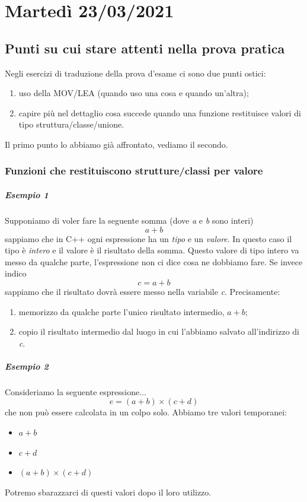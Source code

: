 \documentclass[11pt]{report}
\theoremstyle{definition}
\begin{document}
\chapter{Martedì 23/03/2021}
\section{Punti su cui stare attenti nella prova pratica} Negli esercizi di traduzione della prova d'esame ci sono due punti ostici:
\begin{enumerate}
\item uso della MOV/LEA (quando uso una cosa e quando un'altra);
\item capire più nel dettaglio cosa succede quando una funzione restituisce valori di tipo struttura/classe/unione.
\end{enumerate}
Il primo punto lo abbiamo già affrontato, vediamo il secondo. 
\subsection{Funzioni che restituiscono strutture/classi per valore}
\paragraph{Esempio 1} Supponiamo di voler fare la seguente somma (dove \emph{a} e \emph{b} sono interi)
\[a+b\]
sappiamo che in C++ ogni espressione ha un \emph{tipo} e un \emph{valore}. In questo caso il tipo è \emph{intero} e il valore è il risultato della somma. Questo valore di tipo intero va messo da qualche parte, l'espressione non ci dice cosa ne dobbiamo fare. Se invece indico
\[c=a+b\]
sappiamo che il risultato dovrà essere messo nella variabile \emph{c}. Precisamente:
\begin{enumerate}
	\item memorizzo da qualche parte l'unico risultato intermedio, $a+b$;
	\item copio il risultato intermedio dal luogo in cui l'abbiamo salvato all'indirizzo di \emph{c}.
\end{enumerate}
\paragraph{Esempio 2} Consideriamo la seguente espressione...
\[e=(a+b) \times (c+d)\]
che non può essere calcolata in un colpo solo. Abbiamo tre valori temporanei:
\begin{itemize}
	\item $a+b$
	\item $c+d$
	\item $(a+b) \times (c+d)$
\end{itemize} 
Potremo sbarazzarci di questi valori dopo il loro utilizzo.
\end{document}
